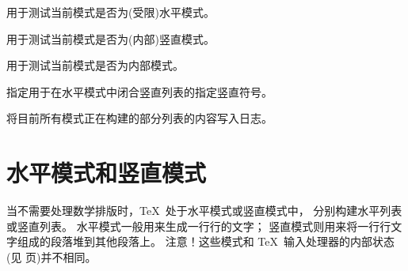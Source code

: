 \documentclass{book}
\begin{document}
\label{cschap:vadjust}\label{cschap:showlists}
\begin{inventory}
\item [\cs{ifhmode}] 
      用于测试当前模式是否为(受限)水平模式。

\item [\cs{ifvmode}] 
      用于测试当前模式是否为(内部)竖直模式。

\item [\cs{ifinner}] 
      用于测试当前模式是否为内部模式。

\item [\cs{vadjust}] 
      指定用于在水平模式中闭合竖直列表的指定竖直符号。

\item [\cs{showlists}] 
      将目前所有模式正在构建的部分列表的内容写入日志。
\end{inventory}

\section{水平模式和竖直模式}

当不需要处理数学排版时，\TeX\ 处于水平模式或竖直模式中，
分别构建水平列表或竖直列表。
水平模式一般用来生成一行行的文字；
竖直模式则用来将一行行文字组成的段落堆到其他段落上。
注意！这些模式和 \TeX\ 输入处理器的内部状态
(见 \pageref{input:states} 页)并不相同。
\end{document}

